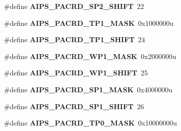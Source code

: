 \begin{DoxyCompactItemize}
\item 
\#define {\bfseries A\+I\+P\+S\+\_\+\+P\+A\+C\+R\+D\+\_\+\+S\+P2\+\_\+\+S\+H\+I\+FT}~22\hypertarget{group__AIPS__Register__Masks_gaabe4dbc699fce93ae30f6f9aacd71fc5}{}\label{group__AIPS__Register__Masks_gaabe4dbc699fce93ae30f6f9aacd71fc5}

\item 
\#define {\bfseries A\+I\+P\+S\+\_\+\+P\+A\+C\+R\+D\+\_\+\+T\+P1\+\_\+\+M\+A\+SK}~0x1000000u\hypertarget{group__AIPS__Register__Masks_gabcd4b3b6c8f30bfb2c00734085d672ee}{}\label{group__AIPS__Register__Masks_gabcd4b3b6c8f30bfb2c00734085d672ee}

\item 
\#define {\bfseries A\+I\+P\+S\+\_\+\+P\+A\+C\+R\+D\+\_\+\+T\+P1\+\_\+\+S\+H\+I\+FT}~24\hypertarget{group__AIPS__Register__Masks_gac9dda4ac143e1f9b192d0c3881a5ab19}{}\label{group__AIPS__Register__Masks_gac9dda4ac143e1f9b192d0c3881a5ab19}

\item 
\#define {\bfseries A\+I\+P\+S\+\_\+\+P\+A\+C\+R\+D\+\_\+\+W\+P1\+\_\+\+M\+A\+SK}~0x2000000u\hypertarget{group__AIPS__Register__Masks_gaf7b7df71ca00c77a7bc509549669454c}{}\label{group__AIPS__Register__Masks_gaf7b7df71ca00c77a7bc509549669454c}

\item 
\#define {\bfseries A\+I\+P\+S\+\_\+\+P\+A\+C\+R\+D\+\_\+\+W\+P1\+\_\+\+S\+H\+I\+FT}~25\hypertarget{group__AIPS__Register__Masks_ga644673f7f2e0212bd11a3f1a6b85884a}{}\label{group__AIPS__Register__Masks_ga644673f7f2e0212bd11a3f1a6b85884a}

\item 
\#define {\bfseries A\+I\+P\+S\+\_\+\+P\+A\+C\+R\+D\+\_\+\+S\+P1\+\_\+\+M\+A\+SK}~0x4000000u\hypertarget{group__AIPS__Register__Masks_ga241bd7210bde69f69f42d0b09b255044}{}\label{group__AIPS__Register__Masks_ga241bd7210bde69f69f42d0b09b255044}

\item 
\#define {\bfseries A\+I\+P\+S\+\_\+\+P\+A\+C\+R\+D\+\_\+\+S\+P1\+\_\+\+S\+H\+I\+FT}~26\hypertarget{group__AIPS__Register__Masks_ga2016362f517305d3780b3db76654c9e2}{}\label{group__AIPS__Register__Masks_ga2016362f517305d3780b3db76654c9e2}

\item 
\#define {\bfseries A\+I\+P\+S\+\_\+\+P\+A\+C\+R\+D\+\_\+\+T\+P0\+\_\+\+M\+A\+SK}~0x10000000u\hypertarget{group__AIPS__Register__Masks_gab6c35b9973f892499844b50d600f19e2}{}\label{group__AIPS__Register__Masks_gab6c35b9973f892499844b50d600f19e2}


\end{DoxyCompactItemize}
